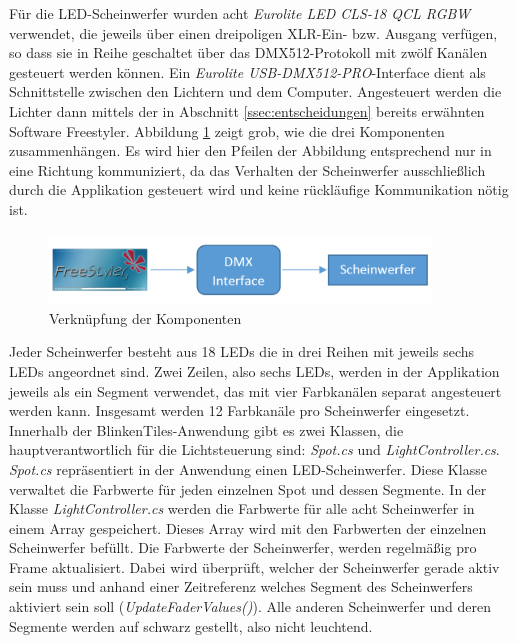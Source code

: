 \label{ssec:DMX}

Für die LED-Scheinwerfer wurden acht \emph{Eurolite LED CLS-18 QCL RGBW} verwendet, die jeweils über einen dreipoligen XLR-Ein- bzw. Ausgang verfügen, so dass sie in Reihe geschaltet über das DMX512-Protokoll mit zwölf Kanälen gesteuert werden können. Ein \emph{Eurolite USB-DMX512-PRO}-Interface dient als Schnittstelle zwischen den Lichtern und dem Computer. Angesteuert werden die Lichter dann mittels der in Abschnitt \ref{ssec:entscheidungen} bereits erwähnten Software Freestyler. Abbildung \ref{fig:FStoLED} zeigt grob, wie die drei Komponenten zusammenhängen. Es wird hier den Pfeilen der Abbildung entsprechend nur in eine Richtung kommuniziert, da das Verhalten der Scheinwerfer ausschließlich durch die Applikation gesteuert wird und keine rückläufige Kommunikation nötig ist.

\begin{figure}[htbp]
	\centering
		\includegraphics[width=0.90\textwidth]{images/FStoDMXInterfaceToLEDs.PNG}
	\caption{Verknüpfung der Komponenten}
	\label{fig:FStoLED}
\end{figure}

Jeder Scheinwerfer besteht aus 18 LEDs die in drei Reihen mit jeweils sechs LEDs angeordnet sind. Zwei Zeilen, also sechs LEDs, werden in der Applikation jeweils als ein Segment verwendet, das mit vier Farbkanälen separat angesteuert werden kann. Insgesamt werden 12 Farbkanäle pro Scheinwerfer eingesetzt. Innerhalb der BlinkenTiles-Anwendung gibt es zwei Klassen, die hauptverantwortlich für die Lichtsteuerung sind: \emph{Spot.cs} und \emph{LightController.cs}. \emph{Spot.cs} repräsentiert in der Anwendung einen LED-Scheinwerfer. Diese Klasse verwaltet die Farbwerte für jeden einzelnen Spot und dessen Segmente. In der Klasse \emph{LightController.cs} werden die Farbwerte für alle acht Scheinwerfer in einem Array gespeichert. Dieses Array wird mit den Farbwerten der einzelnen Scheinwerfer befüllt. Die Farbwerte der Scheinwerfer, werden regelmäßig pro Frame aktualisiert. Dabei wird überprüft, welcher der Scheinwerfer gerade aktiv sein muss und anhand einer Zeitreferenz welches Segment des Scheinwerfers aktiviert sein soll (\emph{UpdateFaderValues()}). Alle anderen Scheinwerfer und deren Segmente werden auf schwarz gestellt, also nicht leuchtend. 

